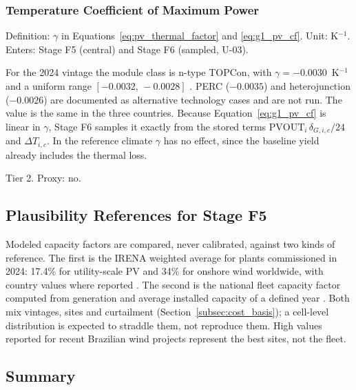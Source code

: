 \subsubsection{Temperature Coefficient of Maximum Power}

Definition: $\gamma$ in Equations~\ref{eq:pv_thermal_factor} and
\ref{eq:g1_pv_cf}. Unit: K$^{-1}$. Enters: Stage F5 (central) and Stage
F6 (sampled, U-03).

For the 2024 vintage the module class is n-type TOPCon, with
$\gamma=-0.0030$~K$^{-1}$ and a uniform range $[-0.0032,\,-0.0028]$
\cite{bamisile2025,itrpv2025}. PERC ($-0.0035$) and heterojunction
($-0.0026$) are documented as alternative technology cases and are not
run. The value is the same in the three countries. Because
Equation~\ref{eq:g1_pv_cf} is linear in $\gamma$, Stage F6 samples it
exactly from the stored terms $\mathrm{PVOUT}_i\,\delta_{G,i,c}/24$ and
$\Delta T_{i,c}$. In the reference climate $\gamma$ has no effect, since
the baseline yield already includes the thermal loss.

Tier 2. Proxy: no.

\subsection{Plausibility References for Stage F5}
\label{subsec:g1_plausibility}

Modeled capacity factors are compared, never calibrated, against two
kinds of reference. The first is the IRENA weighted average for plants
commissioned in 2024: 17.4\% for utility-scale PV and 34\% for onshore
wind worldwide, with country values where reported
\cite{irena2025costs2024}. The second is the national fleet capacity
factor computed from generation and average installed capacity of a
defined year \cite{epeAnuario2025,ceaGeneration,dgegRenewables}.
Both mix vintages, sites and curtailment
(Section~\ref{subsec:cost_basis}); a cell-level distribution is expected
to straddle them, not reproduce them. High values reported for recent
Brazilian wind projects represent the best sites, not the fleet.

\subsection{Summary}
\label{subsec:g1_summary}

